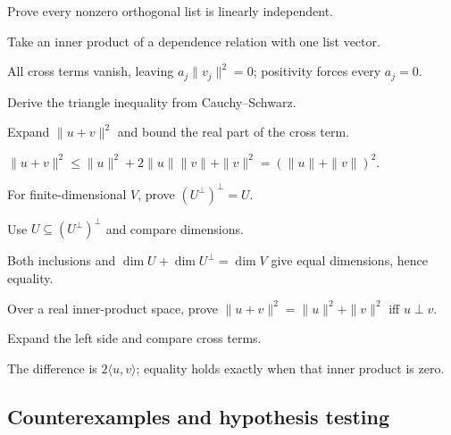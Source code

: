 \begin{exercise}\label{exr:i13-expand-06}
Prove every nonzero orthogonal list is linearly independent.
\end{exercise}
\begin{hint}
Take an inner product of a dependence relation with one list vector.
\end{hint}
\begin{solution}
All cross terms vanish, leaving \(a_j\|v_j\|^2=0\); positivity forces every \(a_j=0\).
\end{solution}

\begin{exercise}\label{exr:i13-expand-07}
Derive the triangle inequality from Cauchy--Schwarz.
\end{exercise}
\begin{hint}
Expand \(\|u+v\|^2\) and bound the real part of the cross term.
\end{hint}
\begin{solution}
\(\|u+v\|^2\le\|u\|^2+2\|u\|\|v\|+\|v\|^2=(\|u\|+\|v\|)^2\).
\end{solution}

\begin{exercise}\label{exr:i13-expand-08}
For finite-dimensional \(V\), prove \((U^\perp)^\perp=U\).
\end{exercise}
\begin{hint}
Use \(U\subseteq(U^\perp)^\perp\) and compare dimensions.
\end{hint}
\begin{solution}
Both inclusions and \(\dim U+\dim U^\perp=\dim V\) give equal dimensions, hence equality.
\end{solution}

\begin{exercise}\label{exr:i13-expand-09}
Over a real inner-product space, prove \(\|u+v\|^2=\|u\|^2+\|v\|^2\) iff \(u\perp v\).
\end{exercise}
\begin{hint}
Expand the left side and compare cross terms.
\end{hint}
\begin{solution}
The difference is \(2\langle u,v\rangle\); equality holds exactly when that inner product is zero.
\end{solution}

\subsection*{Counterexamples and hypothesis testing}


